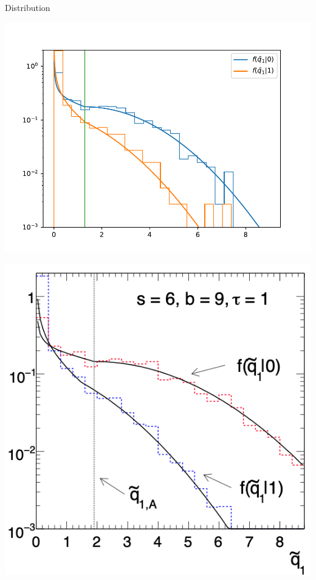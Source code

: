 \documentclass[aspectratio=1610, 9pt]{beamer}
\begin{document}
\begin{frame}{Distribution}
    \Large
    \centering
    \begin{minipage}{0.49\textwidth}
        \includegraphics[width=\textwidth]{plots/paper_plot.pdf}
    \end{minipage}
    \hfill
    \begin{minipage}{0.5\textwidth}
        \includegraphics[width=\textwidth]{imgs/distribution.png}
    \end{minipage}
\end{frame}
\end{document}
